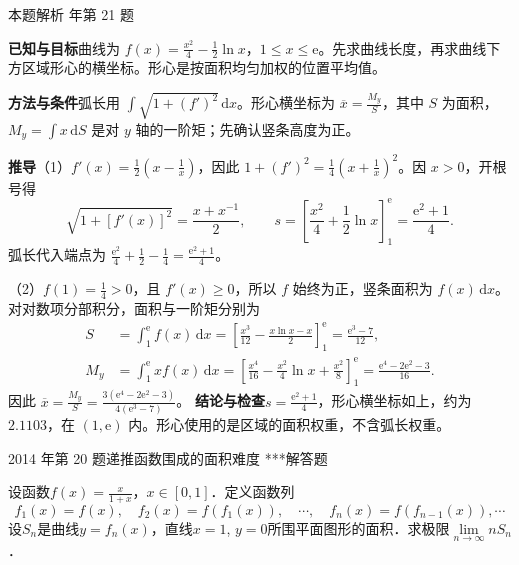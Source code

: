 \documentclass[UTF8,zihao=-4,fontset=fandol]{ctexart}
\renewcommand{\lim}{\operatorname*{lim}\limits}
\newcounter{BankQuestion}
\newcommand{\QuestionPage}[7]{%
  \stepcounter{BankQuestion}%
  \par\noindent\begin{minipage}{\linewidth}
  \raggedright
  {\small\textcolor{black!60}{#3\quad #5\quad 难度 #7}\hfill\textcolor{accent}{#2}}\par\smallskip}
\newcommand{\QuestionEnd}{\end{minipage}\par\medskip}
\newcommand{\QuestionPage}[7]{%
  \clearpage
  \stepcounter{BankQuestion}%
  {\small\textcolor{accent}{#1\hfill #2}}\par\medskip
  {\small\textcolor{black!60}{#3\quad #5\quad 难度 #7\hfill \arabic{BankQuestion} / 234}}\par\vspace{9bp}}
\newcommand{\QuestionEnd}{}
\newenvironment{QuestionSolution}[1]{%
  \clearpage
  {\small\textcolor{black!60}{本题解析\quad #1}}\par\medskip
}{\par\clearpage}
\begin{document}
\begin{QuestionSolution}{2013 年第 21 题}
\textbf{已知与目标}\quad 曲线为 \(f(x)=\frac{x^2}{4}-\frac{1}{2}\ln x\)，\(1\le x\le\mathrm{e}\)。先求曲线长度，再求曲线下方区域形心的横坐标。形心是按面积均匀加权的位置平均值。

\textbf{方法与条件}\quad 弧长用 \(\int\sqrt{1+(f')^2}\,\mathrm{d}x\)。形心横坐标为 \(\overline{x}=\frac{M_y}{S}\)，其中 \(S\) 为面积，\(M_y=\int x\,\mathrm{d}S\) 是对 \(y\) 轴的一阶矩；先确认竖条高度为正。

\textbf{推导}\quad （1）\(f'(x)=\frac{1}{2}(x-\frac{1}{x})\)，因此 \(1+(f')^2=\frac{1}{4}(x+\frac{1}{x})^2\)。因 \(x>0\)，开根号得
\[
\sqrt{1+[f'(x)]^2}=\frac{x+x^{-1}}{2},
\qquad
s=\left[\frac{x^2}{4}+\frac12\ln x\right]_1^{\mathrm{e}}
=\boxed{\frac{\mathrm{e}^2+1}{4}}.
\]
弧长代入端点为 \(\frac{\mathrm{e}^2}{4}+\frac{1}{2}-\frac{1}{4}=\frac{\mathrm{e}^2+1}{4}\)。

（2）\(f(1)=\frac{1}{4}>0\)，且 \(f'(x)\ge0\)，所以 \(f\) 始终为正，竖条面积为 \(f(x)\,\mathrm{d}x\)。对对数项分部积分，面积与一阶矩分别为
\[
\begin{aligned}
S&=\int_1^{\mathrm{e}} f(x)\,\mathrm{d}x
=\left[\frac{x^3}{12}-\frac{x\ln x-x}{2}\right]_1^{\mathrm{e}}
=\frac{\mathrm{e}^3-7}{12},\\
M_y&=\int_1^{\mathrm{e}} xf(x)\,\mathrm{d}x
=\left[\frac{x^4}{16}-\frac{x^2}{4}\ln x+\frac{x^2}{8}\right]_1^{\mathrm{e}}
=\frac{\mathrm{e}^4-2\mathrm{e}^2-3}{16}.
\end{aligned}
\]
因此 \(\overline{x}=\frac{M_y}{S}=\boxed{\frac{3(\mathrm{e}^4-2\mathrm{e}^2-3)}{4(\mathrm{e}^3-7)}}\)。
\textbf{结论与检查}\quad \(\boxed{s=\frac{\mathrm{e}^2+1}{4}}\)，形心横坐标如上，约为 \(2.1103\)，在 \((1,\mathrm{e})\) 内。形心使用的是区域的面积权重，不含弧长权重。
\end{QuestionSolution}

\QuestionPage{3.4 定积分的应用}{解答题}{2014 年第 20 题}{3}{递推函数围成的面积}{180 / 234}{***}
设函数$f(x) = \frac{x}{1 + x}$，$x \in [0,1]$．定义函数列
\[
f_1(x) = f(x),\quad f_2(x) = f(f_1(x)),\quad \cdots,\quad f_n(x) = f(f_{n - 1}(x)), \cdots
\]
设$S_n$是曲线$y = f_n(x)$，直线$x = 1$, $y = 0$所围平面图形的面积．求极限$\lim_{n \to \infty} nS_n$．
\QuestionEnd
\end{document}
